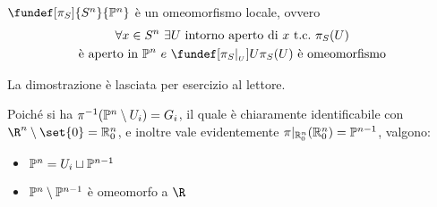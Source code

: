 \begin{prop}
	$\fundef[\pi_S]{S^n}{\Ps^n}$ è un omeomorfismo locale, ovvero
	\begin{gather*}
	\forall x \in S^n \ \exists U \text{ intorno aperto di } x \tc \pi_S(U) \\
	\text{è aperto in } \Ps^n \ e \ \fundef[\pi_S | _{_U}]{U}{\pi_S(U)} \text{ è omeomorfismo}
	\end{gather*}
\end{prop}
La dimostrazione è lasciata per esercizio al lettore.

Poiché si ha $\pi^{-1}(\mathbb{P}^n \setminus U_i) = G_i$, il quale è chiaramente identificabile con $\R^n \setminus \set{0} = \Ro$, e inoltre vale evidentemente $\pi | _{\mathbb{R}_0^{n}} (\mathbb{R}_0^{n}) = \mathbb{P}^{n-1}$, valgono:
\begin{itemize}
	\item $\mathbb{P}^n = U_i \sqcup \mathbb{P}^{n-1}$
	\item $\mathbb{P}^n \setminus \mathbb{P}^{n-1}$ è omeomorfo a $\R$
\end{itemize}


